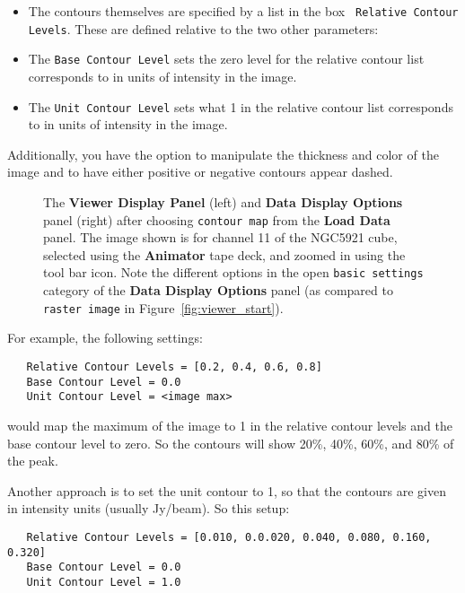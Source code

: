 \begin{itemize}
\item The contours themselves are specified by a list in the box {\tt
  Relative Contour Levels}. These are defined relative to the two
  other parameters:
\item The {\tt Base Contour Level} sets the zero level for the
relative contour list corresponds to in units of intensity in the image.
\item The {\tt Unit Contour Level} sets what 1 in the relative contour list
corresponds to in units of intensity in the image.
\end{itemize}

Additionally, you have the option to manipulate the thickness and color of
the image and to have either positive or negative contours appear dashed.
 
\begin{figure}[h!]
\begin{center}
\caption{\label{fig:viewer_con} The {\bf Viewer Display Panel}
(left) and {\bf Data Display Options} panel (right) after choosing
{\tt contour map} from the {\bf Load Data} panel.  The
image shown is for channel 11 of the NGC5921 cube, selected using
the {\bf Animator} tape deck, and zoomed in using the tool bar icon.
Note the different options in the open {\tt basic settings} category
of the {\bf Data Display Options} panel (as compared to {\tt raster image} in
Figure~\ref{fig:viewer_start}).}
\hrulefill
\end{center}
\end{figure}

For example, the following settings:

\small
\begin{verbatim}
   Relative Contour Levels = [0.2, 0.4, 0.6, 0.8]
   Base Contour Level = 0.0
   Unit Contour Level = <image max>
\end{verbatim}
\normalsize

would map the maximum of the image to 1 in the relative contour levels and the base contour level to
zero. So the contours will show 20\%, 40\%, 60\%, and 80\% of the peak.

Another approach is to set the unit contour to 1, so that the contours
are given in intensity units (usually Jy/beam). So this setup:

\small
\begin{verbatim}
   Relative Contour Levels = [0.010, 0.0.020, 0.040, 0.080, 0.160, 0.320]
   Base Contour Level = 0.0
   Unit Contour Level = 1.0
\end{verbatim}
\normalsize


